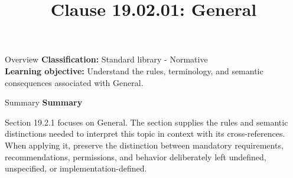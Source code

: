 \documentclass[10pt,letterpaper]{article}
\title{Clause 19.02.01: General}
\author{}
\date{}
\begin{document}
\maketitle
\begin{CornellOverviewBox}{Overview}
\textbf{Classification:} Standard library - Normative\\[2pt]
\textbf{Learning objective:} Understand the rules, terminology, and semantic consequences associated with General.
\end{CornellOverviewBox}\begin{CornellSummaryBox}{Summary}
{\sffamily\bfseries\color{Accent} Summary}\par\vspace{3pt}Section 19.2.1 focuses on General. The section supplies the rules and semantic distinctions needed to interpret this topic in context with its cross-references. When applying it, preserve the distinction between mandatory requirements, recommendations, permissions, and behavior deliberately left undefined, unspecified, or implementation-defined.
\end{CornellSummaryBox}
\end{document}
